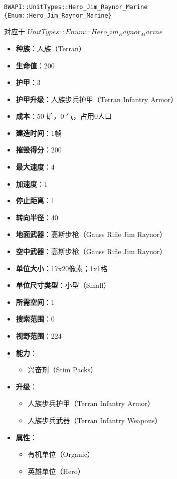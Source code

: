 \begin{tcolorbox}[colback=white, colframe=black!60!white, title=Hero\_Jim\_Raynor\_Marine(), arc=0mm]
    \begin{verbatim}
BWAPI::UnitTypes::Hero_Jim_Raynor_Marine {Enum::Hero_Jim_Raynor_Marine}
    \end{verbatim}
    对应于  $ UnitTypes::Enum::Hero_Jim_Raynor_Marine $ 
    \begin{itemize}
        \item \textbf{种族}：人族（Terran）
        \item \textbf{生命值}：200
        \item \textbf{护甲}：3
        \item \textbf{护甲升级}：人族步兵护甲（Terran Infantry Armor）
        \item \textbf{成本}：50 矿，0 气，占用0人口
        \item \textbf{建造时间}：1帧
        \item \textbf{摧毁得分}：200
        \item \textbf{最大速度}：4
        \item \textbf{加速度}：1
        \item \textbf{停止距离}：1
        \item \textbf{转向半径}：40
        \item \textbf{地面武器}：高斯步枪（Gauss Rifle Jim Raynor）
        \item \textbf{空中武器}：高斯步枪（Gauss Rifle Jim Raynor）
        \item \textbf{单位大小}：17x20像素；1x1格
        \item \textbf{单位尺寸类型}：小型（Small）
        \item \textbf{所需空间}：1
        \item \textbf{搜索范围}：0
        \item \textbf{视野范围}：224
        \item \textbf{能力}：
            \begin{itemize}
                \item 兴奋剂（Stim Packs）
            \end{itemize}
        \item \textbf{升级}：
            \begin{itemize}
                \item 人族步兵护甲（Terran Infantry Armor）
                \item 人族步兵武器（Terran Infantry Weapons）
            \end{itemize}
        \item \textbf{属性}：
            \begin{itemize}
                \item 有机单位（Organic）
                \item 英雄单位（Hero）
            \end{itemize}
    \end{itemize}
    
\end{tcolorbox}

